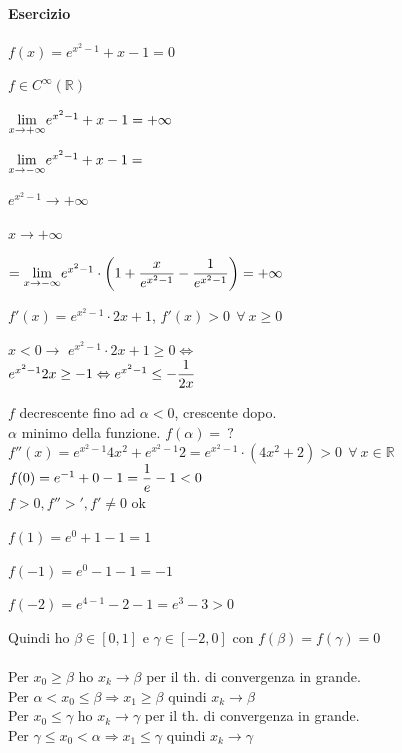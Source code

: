 \documentclass[10pt]{book}
\begin{document}
\paragraph{Esercizio} $f(x) = e^{x^2-1} + x - 1 = 0$
\begin{multicols}{2}
$f \in C^\infty(\mathbb{R})$
\begin{list}{}{}
	\item $\mathlarger{\lim_{x\to+\infty}} e^{x^2-1} + x - 1 = +\infty$
	\item $\mathlarger{\lim_{x\to-\infty}} e^{x^2-1} + x - 1 =$
	\begin{list}{}{}
		\item $e^{x^2 - 1}\rightarrow+\infty$
		\item $x\rightarrow+\infty$
	\end{list}
	$= \mathlarger{\lim_{x\to-\infty}}e^{x^2 - 1}\cdot\mathlarger{\left(1 + \frac{x}{e^{x^2 - 1}} - \frac{1}{e^{x^2 - 1}} \right)} = +\infty$
\end{list}
$f'(x) = e^{x^2 - 1}\cdot 2x + 1$, $f'(x) > 0\:\:\forall\:x\geq 0$
\begin{list}{}{}
	\item[$x < 0 \rightarrow$] $e^{x^2 - 1}\cdot 2x + 1 \geq 0 \Leftrightarrow$\\
	$e^{x^2-1}2x\geq -1 \Leftrightarrow e^{x^2 - 1}\leq \mathlarger{-\frac{1}{2x}}$
\end{list}
$f$ decrescente fino ad $\alpha < 0$, crescente dopo.\\$\alpha$ minimo della funzione. $f(\alpha) =\:?$\\
$f''(x) = e^{x^2-1}4x^2 + e^{x^2-1}2 = e^{x^2-1}\cdot(4x^2 + 2) > 0\:\:\forall\:x\in\mathbb{R}$\\
$f(0) = e^{-1} + 0 - 1 = \mathlarger{\frac{1}{e}}-1 < 0$\\
$f>0, f''>', f'\neq 0$ ok
\begin{list}{}{}
	\item $f(1) = e^0 + 1 - 1 = 1$
	\item $f(-1) = e^0 - 1 - 1 = -1$
	\item $f(-2) = e^{4-1} - 2 - 1 = e^3 - 3 > 0$
\end{list}
Quindi ho $\beta \in [0, 1]$ e $\gamma\in[-2, 0]$ con $f(\beta) = f(\gamma) = 0$\\\\
Per $x_0\geq\beta$ ho $x_k \rightarrow \beta$ per il th. di convergenza in grande.\\
Per $\alpha < x_0 \leq \beta\Rightarrow x_1\geq\beta$ quindi $x_k \rightarrow\beta$\\
Per $x_0\leq \gamma$ ho $x_k \rightarrow \gamma$ per il th. di convergenza in grande.\\
Per $\gamma\leq x_0 < \alpha \Rightarrow x_1 \leq \gamma$ quindi $x_k\rightarrow\gamma$
\end{multicols}
\end{document}
